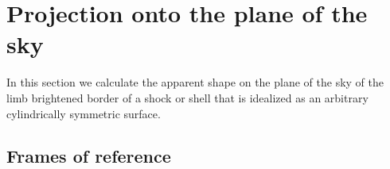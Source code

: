 \newenvironment{Vector}{\left(\begin{array}{c}}{\end{array}\right)}
\newcommand\uvec[1]{\bm{\hat{#1}}}
\newcommand\T{_{\mathrm{\scriptscriptstyle T}}}

\section{Projection onto the plane of the sky}
\label{sec:projection}

In this section we calculate the apparent shape on the plane of the
sky of the limb brightened border of a shock or shell that is
idealized as an arbitrary cylindrically symmetric surface.

\subsection{Frames of reference}


